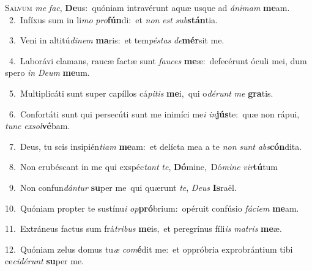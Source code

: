 \lettrine{\initial\textcolor{\initialcolor}{S}}{alvum} \textit{me} \textit{fac}\-, \textbf{De}\-us:~\star quóniam intravérunt aquæ usque ad \textit{á}\-\textit{ni}\textit{mam} \textbf{me}\-am.\\
{\numbfont\textcolor{\numbcolor}{~2.}}~Infíxus sum in li\textit{mo} \textit{pro}\-\textbf{fún}di:~\star et \textit{non} \textit{est} \textit{sub}\-\textbf{stán}tia.\par
{\numbfont\textcolor{\numbcolor}{~3.}}~Veni in altitú\-\textit{di}\-\textit{nem} \textbf{ma}\-ris:~\star et tem\-\textit{pés}\-\textit{tas} \textit{de}\-\textbf{mér}sit me.\par
{\numbfont\textcolor{\numbcolor}{~4.}}~Laborávi clamans, raucæ factæ sunt \textit{fau}\-\textit{ces} \textbf{me}\-æ:~\star defecérunt óculi mei, dum spero \textit{in} \textit{De}\-\textit{um} \textbf{me}\-um.\par
{\numbfont\textcolor{\numbcolor}{~5.}}~Multiplicáti sunt super capíllos cá\-\textit{pi}\-\textit{tis} \textbf{me}\-i,~\star qui o\-\textit{dé}\-\textit{runt} \textit{me} \textbf{gra}\-tis.\par
{\numbfont\textcolor{\numbcolor}{~6.}}~Confortáti sunt qui persecúti sunt me inimíci me\textit{i} \textit{in}\-\textbf{jús}te:~\star quæ non rápui, \textit{tunc} \textit{ex}\-\textit{sol}\textbf{vé}bam.\par
{\numbfont\textcolor{\numbcolor}{~7.}}~Deus, tu scis insipién\-\textit{ti}\-\textit{am} \textbf{me}\-am:~\star et delícta mea a te \textit{non} \textit{sunt} \textit{abs}\-\textbf{cón}dita.\par
{\numbfont\textcolor{\numbcolor}{~8.}}~Non erubéscant in me qui exspéc\textit{tant} \textit{te}\-, \textbf{Dó}\-mine,~\star Dó\-\textit{mi}\-\textit{ne} \textit{vir}\-\textbf{tú}tum\par
{\numbfont\textcolor{\numbcolor}{~9.}}~Non confun\-\textit{dán}\-\textit{tur} \textbf{su}\-per me~\star qui quærunt \textit{te}\-, \textit{De}\-\textit{us} \textbf{Is}\-raël.\par
{\numbfont\textcolor{\numbcolor}{10.}}~Quóniam propter te sustínu\textit{i} \textit{op}\-\textbf{pró}brium:~\star opéruit confúsio \textit{fá}\-\textit{ci}\textit{em} \textbf{me}\-am.\par
{\numbfont\textcolor{\numbcolor}{11.}}~Extráneus factus sum frá\-\textit{tri}\-\textit{bus} \textbf{me}\-is,~\star et peregrínus fíli\textit{is} \textit{ma}\-\textit{tris} \textbf{me}\-æ.\par
{\numbfont\textcolor{\numbcolor}{12.}}~Quóniam zelus domus tu\textit{æ} \textit{com}\-\textbf{é}dit me:~\star et oppróbria exprobrántium tibi ce\-\textit{ci}\-\textit{dé}\textit{runt} \textbf{su}\-per me.\par
